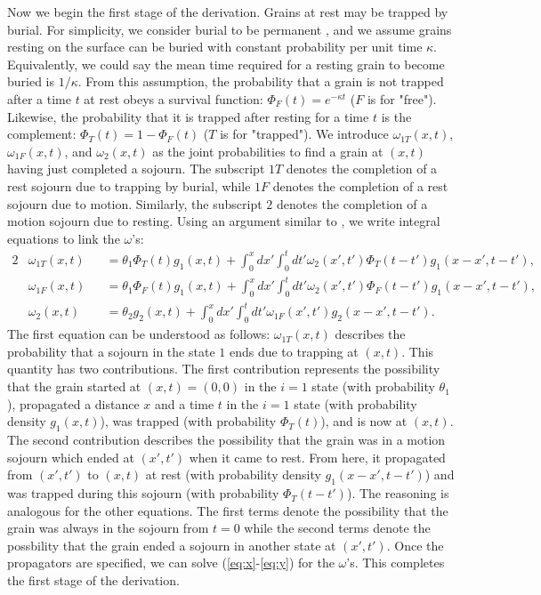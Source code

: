 \documentclass[]{agujournal2018}
\newcommand\om{\omega}
\begin{document}
Now we begin the first stage of the derivation.
Grains at rest may be trapped by burial.
For simplicity, we consider burial to be permanent \citep[e.g.][]{Wu2019}, and we assume grains resting on the surface can be buried with constant probability per unit time $\kappa$.
Equivalently, we could say the mean time required for a resting grain to become buried is $1/\kappa$.
From this assumption, the probability that a grain is not trapped after a time $t$ at rest obeys a survival function: $\Phi_F(t) = e^{-\kappa t}$ ($F$ is for "free"). Likewise, the probability that it is trapped after resting for a time $t$ is the complement: $\Phi_T(t) = 1-\Phi_F(t)$ ($T$ is for "trapped").
We introduce $\omega_{1T}(x,t)$, $\omega_{1F}(x,t)$, and $\omega_2(x,t)$ as the joint probabilities to find a grain at $(x,t)$ having just completed a sojourn.
The subscript ${1T}$ denotes the completion of a rest sojourn due to trapping by burial, while $1F$ denotes the completion of a rest sojourn due to motion.
Similarly, the subscript $2$ denotes the completion of a motion sojourn due to resting.
Using an argument similar to \citet{Weiss1994}, we write integral equations to link the $\omega$'s: 
\begin{alignat}{2}
&\om_{1T}(x,t) &&= \theta_1\Phi_T(t)g_1(x,t) + \int_0^x dx' \int_0^t dt' \om_2(x',t')\Phi_T(t-t')g_1(x-x',t-t')\label{eq:x},\\
&\om_{1F}(x,t) &&= \theta_1\Phi_F(t)g_1(x,t) + \int_0^x dx' \int_0^t dt' \om_2(x',t') \Phi_F(t-t') g_1(x-x',t-t'),\\
&\om_2(x,t) &&= \theta_2 g_2(x,t) + \int_0^x dx' \int_0^t dt' \om_{1F}(x',t')g_2(x-x',t-t'). \label{eq:y}
\end{alignat}
The first equation can be understood as follows: $\omega_{1T}(x,t)$ describes the probability that a sojourn in the state $1$ ends due to trapping at $(x,t)$. This quantity has two contributions. The first contribution represents the possibility that the grain started at $(x,t)=(0,0)$ in the $i=1$ state (with probability $\theta_1$), propagated a distance $x$ and a time $t$ in the $i=1$ state (with probability density $g_1(x,t)$), was trapped (with probability $\Phi_T(t)$), and is now at $(x,t)$. 
The second contribution describes the possibility that the grain was in a motion sojourn which ended at $(x',t')$ when it came to rest. From here, it propagated from $(x',t')$ to $(x,t)$ at rest (with probability density $g_1(x-x',t-t')$) and was trapped during this sojourn (with probability $\Phi_T(t-t')$).
The reasoning is analogous for the other equations. The first terms denote the possibility that the grain was always in the sojourn from $t=0$ while the second terms denote the possbility that the grain ended a sojourn in another state at $(x',t')$.
Once the propagators are specified, we can solve (\ref{eq:x}-\ref{eq:y}) for the $\omega$'s. This completes the first stage of the derivation.
\end{document}

